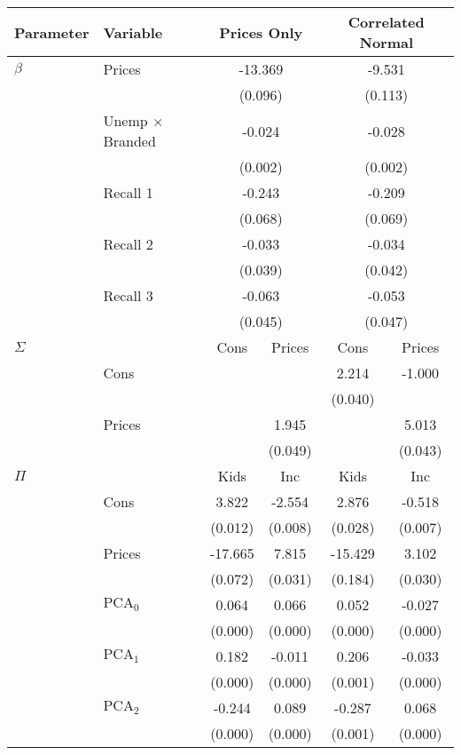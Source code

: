\begin{tabular}{ll|cc|cc}
\toprule
 Parameter & Variable & \multicolumn{2}{c|}{Prices Only}& \multicolumn{2}{c}{Correlated Normal} \\
\midrule
 $\beta$ & Prices & \multicolumn{2}{c|}{-13.369} & \multicolumn{2}{c}{-9.531} \\
 & & \multicolumn{2}{c|}{(0.096)} & \multicolumn{2}{c}{(0.113)} \\
 & Unemp $\times$ Branded & \multicolumn{2}{c|}{-0.024} & \multicolumn{2}{c}{-0.028} \\
 & & \multicolumn{2}{c|}{(0.002)} & \multicolumn{2}{c}{(0.002)} \\
 & Recall 1 & \multicolumn{2}{c|}{-0.243} & \multicolumn{2}{c}{-0.209} \\
 & & \multicolumn{2}{c|}{(0.068)} & \multicolumn{2}{c}{(0.069)} \\
 & Recall 2 & \multicolumn{2}{c|}{-0.033} & \multicolumn{2}{c}{-0.034} \\
 & & \multicolumn{2}{c|}{(0.039)} & \multicolumn{2}{c}{(0.042)} \\
 & Recall 3 & \multicolumn{2}{c|}{-0.063} & \multicolumn{2}{c}{-0.053} \\
 & & \multicolumn{2}{c|}{(0.045)} & \multicolumn{2}{c}{(0.047)} \\
 \midrule
 $\Sigma$ & & Cons & Prices & Cons & Prices \\
 \midrule 
 & Cons & & & 2.214 & -1.000 \\
 & & & & (0.040) & \\
 & Prices & & 1.945 & & 5.013 \\
 & & & (0.049) & & (0.043) \\
 \midrule $\Pi$ & & Kids & Inc & Kids & Inc \\
 \midrule & Cons & 3.822 & -2.554 & 2.876 & -0.518 \\
 & & (0.012) & (0.008) & (0.028) & (0.007) \\
 & Prices & -17.665 & 7.815 & -15.429 & 3.102 \\
 & & (0.072) & (0.031) & (0.184) & (0.030) \\
 & $\text{PCA}_0$ & 0.064 & 0.066 & 0.052 & -0.027 \\
 & & (0.000) & (0.000) & (0.000) & (0.000) \\
 & $\text{PCA}_1$ & 0.182 & -0.011 & 0.206 & -0.033 \\
 & & (0.000) & (0.000) & (0.001) & (0.000) \\
 & $\text{PCA}_2$ & -0.244 & 0.089 & -0.287 & 0.068 \\
 & & (0.000) & (0.000) & (0.001) & (0.000) \\


\end{tabular}

